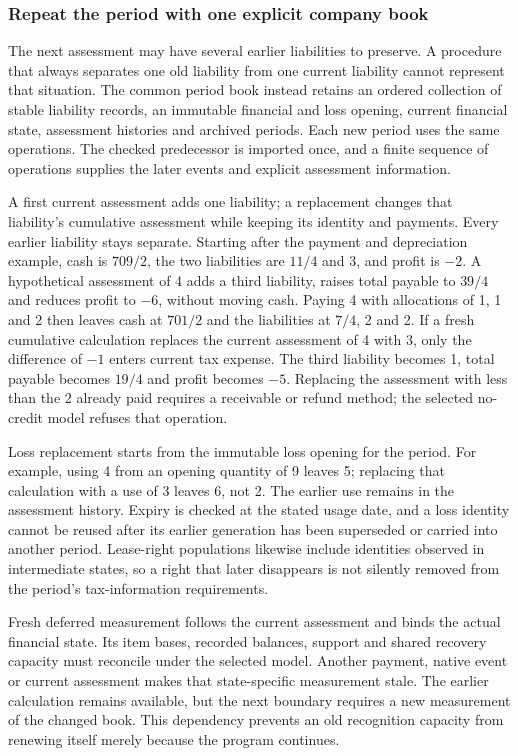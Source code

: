 
\subsubsection*{Repeat the period with one explicit company book}
The next assessment may have several earlier liabilities to preserve. A
procedure that always separates one old liability from one current liability
cannot represent that situation. The common period book instead retains an
ordered collection of stable liability records, an immutable financial and
loss opening, current financial state, assessment histories and archived
periods. Each new period uses the same operations. The checked predecessor is
imported once, and a finite sequence of operations supplies the later events
and explicit assessment information.

A first current assessment adds one liability; a replacement changes that
liability's cumulative assessment while keeping its identity and payments.
Every earlier liability stays separate. Starting after the payment and
depreciation example, cash is $709/2$, the two liabilities are $11/4$ and 3,
and profit is $-2$. A hypothetical assessment of 4 adds a third liability,
raises total payable to $39/4$ and reduces profit to $-6$, without moving cash.
Paying 4 with allocations of 1, 1 and 2 then leaves cash at $701/2$ and the
liabilities at $7/4$, 2 and 2. If a fresh cumulative calculation replaces
the current assessment of 4 with 3, only the difference of $-1$ enters current
tax expense. The third liability becomes 1, total payable becomes $19/4$
and profit becomes $-5$. Replacing the assessment with less than the 2 already
paid requires a receivable or refund method; the selected no-credit model
refuses that operation.

Loss replacement starts from the immutable loss opening for the period. For
example, using 4 from an opening quantity of 9 leaves 5; replacing that
calculation with a use of 3 leaves 6, not 2. The earlier use remains in the
assessment history. Expiry is checked at the stated usage date, and a loss
identity cannot be reused after its earlier generation has been superseded
or carried into another period. Lease-right populations likewise include
identities observed in intermediate states, so a right that later disappears
is not silently removed from the period's tax-information requirements.

Fresh deferred measurement follows the current assessment and binds the actual
financial state. Its item bases, recorded balances, support and shared recovery
capacity must reconcile under the selected model. Another payment, native
event or current assessment makes that state-specific measurement stale. The
earlier calculation remains available, but the next boundary requires a new
measurement of the changed book. This dependency prevents an old recognition
capacity from renewing itself merely because the program continues.

